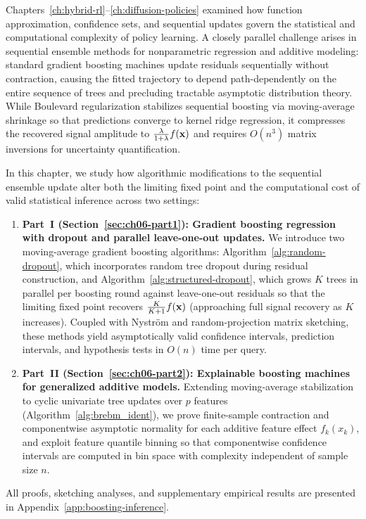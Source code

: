 \begin{aigenblock}
Chapters~\ref{ch:hybrid-rl}--\ref{ch:diffusion-policies} examined how function approximation, confidence sets, and sequential updates govern the statistical and computational complexity of policy learning. A closely parallel challenge arises in sequential ensemble methods for nonparametric regression and additive modeling: standard gradient boosting machines update residuals sequentially without contraction, causing the fitted trajectory to depend path-dependently on the entire sequence of trees and precluding tractable asymptotic distribution theory. While Boulevard regularization \citep{zhou2022boulevard} stabilizes sequential boosting via moving-average shrinkage so that predictions converge to kernel ridge regression, it compresses the recovered signal amplitude to $\frac{\lambda}{1+\lambda}f(\mathbf{x})$ and requires $O(n^3)$ matrix inversions for uncertainty quantification.

In this chapter, we study how algorithmic modifications to the sequential ensemble update alter both the limiting fixed point and the computational cost of valid statistical inference across two settings:
\begin{enumerate}
    \item \textbf{Part~I (Section~\ref{sec:ch06-part1}): Gradient boosting regression with dropout and parallel leave-one-out updates.} We introduce two moving-average gradient boosting algorithms: Algorithm~\ref{alg:random-dropout}, which incorporates random tree dropout during residual construction, and Algorithm~\ref{alg:structured-dropout}, which grows $K$ trees in parallel per boosting round against leave-one-out residuals so that the limiting fixed point recovers $\frac{K}{K+1}f(\mathbf{x})$ (approaching full signal recovery as $K$ increases). Coupled with Nystr\"om and random-projection matrix sketching, these methods yield asymptotically valid confidence intervals, prediction intervals, and hypothesis tests in $O(n)$ time per query.
    \item \textbf{Part~II (Section~\ref{sec:ch06-part2}): Explainable boosting machines for generalized additive models.} Extending moving-average stabilization to cyclic univariate tree updates over $p$ features (Algorithm~\ref{alg:brebm_ident}), we prove finite-sample contraction and componentwise asymptotic normality for each additive feature effect $f_k(x_k)$, and exploit feature quantile binning so that componentwise confidence intervals are computed in bin space with complexity independent of sample size $n$.
\end{enumerate}
All proofs, sketching analyses, and supplementary empirical results are presented in Appendix~\ref{app:boosting-inference}.
\end{aigenblock}

